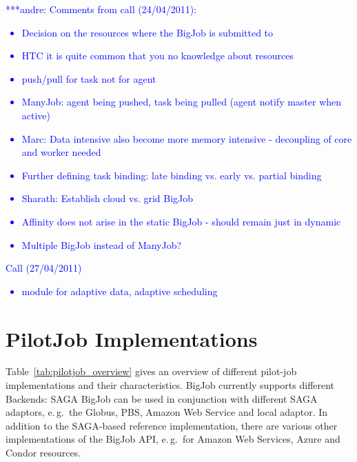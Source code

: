 \documentclass[]{article}
\newcommand{\alnote}[1]{ {\textcolor{blue} { ***andre: #1 }}}
\newcommand{\alnote}[1]{}
\begin{document}
\alnote{Comments from call (24/04/2011):
\begin{itemize}
	\item Decision on the resources where the BigJob is submitted to
	\item HTC it is quite common that you no knowledge about resources
	\item push/pull for task not for agent
	\item ManyJob: agent being pushed, task being pulled (agent notify master when active)
	\item Marc: Data intensive also become more memory intensive - decoupling of core and worker needed
	\item Further defining task binding: late binding vs. early vs. partial binding	
	\item Sharath: Establish cloud vs. grid BigJob
	\item Affinity does not arise in the static BigJob - should remain just in dynamic
	\item Multiple BigJob instead of ManyJob?
\end{itemize}
Call (27/04/2011)
\begin{itemize}
	\item module for adaptive data, adaptive scheduling    
\end{itemize}
}




\section{PilotJob Implementations}

Table~\ref{tab:pilotjob_overview} gives an overview of different pilot-job
implementations and their characteristics. BigJob currently supports different
Backends: SAGA BigJob can be used in conjunction with different SAGA adaptors,
e.\,g.\ the Globus, PBS, Amazon Web Service and local adaptor. In addition to
the SAGA-based reference implementation, there are various other implementations
of the BigJob API, e.\,g.\ for Amazon Web Services, Azure and Condor resources.

\end{document}
